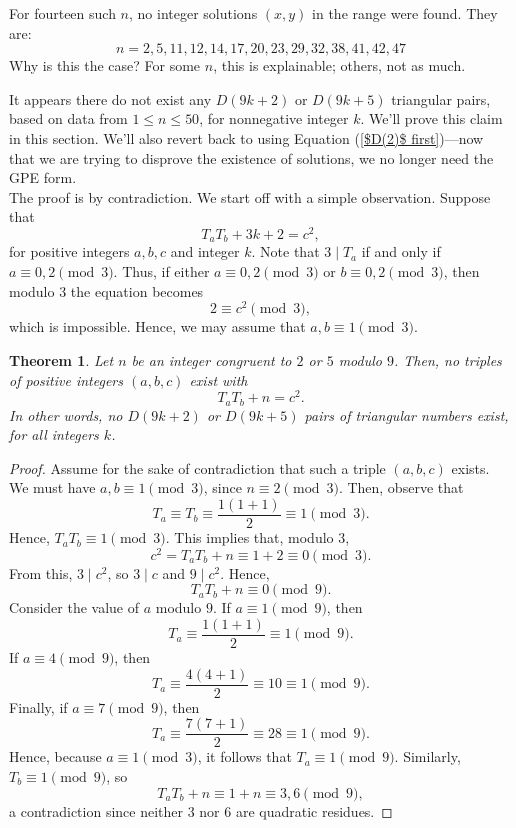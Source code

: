 \documentclass[12pt]{amsart}
\theoremstyle{theorem}
\newtheorem{theorem}{Theorem}
\theoremstyle{definition}
\theoremstyle{plain}
\begin{document}
 For fourteen such $n$, no integer solutions $(x,y)$ in the range were found. They are: $$n = 2, 5, 11, 12, 14, 17, 20, 23, 29, 32, 38, 41, 42, 47$$ Why is this the case? For some $n$, this is explainable; others, not as much.

It appears there do not exist any $D(9k+2)$ or $D(9k+5)$ triangular pairs, based on data from $1 \le n \le 50$, for nonnegative integer $k$.  We'll prove this claim in this section. We'll also revert back to using Equation (\ref{$D(2)$ first})---now that we are trying to disprove the existence of solutions, we no longer need the GPE form. 
\\

The proof is by contradiction. We start off with a simple observation. Suppose that $$T_a T_b + 3k + 2 = c^2,$$ for positive integers $a,b,c$ and integer $k$. Note that $3 \mid T_a$ if and only if $a \equiv 0, 2 \pmod{3}$. Thus, if either $a \equiv 0, 2 \pmod{3}$ or $b \equiv 0, 2 \pmod{3}$, then modulo $3$ the equation becomes $$2 \equiv c^2 \pmod{3},$$ which is impossible. Hence, we may assume that $a, b \equiv 1 \pmod{3}$.

\begin{theorem}
Let $n$ be an integer congruent to $2$ or $5$ modulo $9$. Then, no triples of positive integers $(a,b,c)$ exist with $$T_a T_b + n = c^2.$$ In other words, no $D(9k + 2)$ or $D(9k + 5)$ pairs of triangular numbers exist, for all integers $k$.
\end{theorem}
\begin{proof}
Assume for the sake of contradiction that such a triple $(a,b,c)$ exists. We must have $a, b \equiv 1 \pmod{3}$, since $n \equiv 2 \pmod{3}$. Then, observe that $$T_a \equiv T_b \equiv \frac{1(1+1)}{2} \equiv 1 \pmod{3}.$$ Hence, $T_a T_b \equiv 1 \pmod{3}$. This implies that, modulo $3$, $$c^2 = T_a T_b + n \equiv 1 + 2 \equiv 0 \pmod{3}.$$ From this, $3 \mid c^2$, so $3 \mid c$ and $9 \mid c^2$. Hence, $$T_a T_b + n \equiv 0 \pmod{9}.$$ Consider the value of $a$ modulo $9$. If $a \equiv 1 \pmod{9}$, then $$T_a \equiv \frac{1(1+1)}{2} \equiv 1 \pmod{9}.$$ If $a \equiv 4 \pmod{9}$, then $$T_a \equiv \frac{4(4+1)}{2} \equiv 10 \equiv 1 \pmod{9}.$$ Finally, if $a \equiv 7 \pmod{9}$, then $$T_a \equiv \frac{7(7+1)}{2} \equiv 28 \equiv 1 \pmod{9}.$$ Hence, because $a \equiv 1 \pmod{3}$, it follows that $T_a \equiv 1 \pmod{9}$. Similarly, $T_b \equiv 1 \pmod{9}$, so $$T_a T_b + n \equiv 1 + n \equiv 3, 6 \pmod{9},$$ a contradiction since neither $3$ nor $6$ are quadratic residues.
\end{proof}
\end{document}
